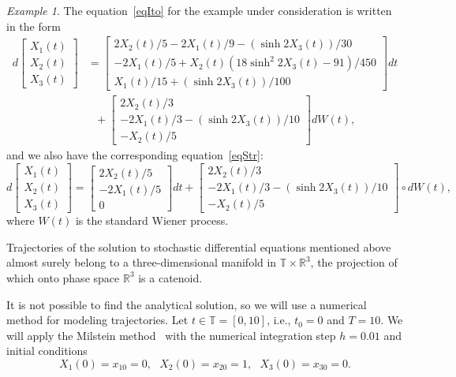 \documentclass[10pt,reqno]{amsart}
\theoremstyle{plain}
\theoremstyle{remark}
\newtheorem{Example}{Example}
\begin{document}
\begin{Example}
The equation~\eqref{eqIto} for the example under consideration is written in the form
\begin{align*}
  d \left[ \begin{array}{c} X_1(t) \\ X_2(t) \\ X_3(t) \end{array} \right] & =
    \left[ \begin{array}{c} 2X_2(t) / 5 - 2X_1(t) / 9 - (\sinh 2X_3(t)) / 30 \\ {-2X_1(t) / 5 + X_2(t) (18\sinh^2 2X_3(t) - 91) / 450} \\ X_1(t)/15 + (\sinh 2X_3(t)) / 100 \end{array} \right] dt \\
  & \ \ \ {} + \left[ \begin{array}{c} 2X_2(t) / 3 \\ {-2X_1(t) / 3 - (\sinh 2X_3(t)) / 10} \\ {-X_2(t) / 5} \end{array} \right] dW(t),
\end{align*}
and we also have the corresponding equation~\eqref{eqStr}:
\[
  d \left[ \begin{array}{c} X_1(t) \\ X_2(t) \\ X_3(t) \end{array} \right] =
    \left[ \begin{array}{c} 2X_2(t) / 5 \\ {-2X_1(t) / 5} \\ 0 \end{array} \right] dt +
    \left[ \begin{array}{c} 2X_2(t) / 3 \\ {-2X_1(t) / 3 - (\sinh 2X_3(t)) / 10} \\ {-X_2(t) / 5} \end{array} \right] \circ dW(t),
\]
where $W(t)$ is the standard Wiener process.

Trajectories of the solution to stochastic differential equations mentioned above almost surely belong to a three-dimensional manifold in $\mathds{T} \times \mathds{R}^3$, the projection of which onto phase space $\mathds{R}^3$ is a catenoid.

It is not possible to find the analytical solution, so we will use a numerical method for modeling trajectories. Let $t \in \mathds{T} = [0,10]$, i.e., $t_0 = 0$ and $T = 10$. We will apply the Milstein method~\cite{MilTre_04} with the numerical integration step $h = 0.01$ and initial conditions
\[
  X_1(0) = x_{10} = 0, \ \ \ X_2(0) = x_{20} = 1, \ \ \ X_3(0) = x_{30} = 0.
\]


\end{Example}
\end{document}
